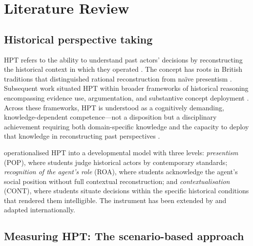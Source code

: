 \documentclass[pdflatex,sn-apa]{sn-jnl}%
\begin{document}

\section{Literature Review}\label{sec:litreview}

\subsection{Historical perspective taking}\label{subsec:hpt}

HPT refers to the ability to understand past actors' decisions by reconstructing the historical context in which they operated \citep{Lee2001, Hartmann2008}. The concept has roots in British traditions that distinguished rational reconstruction from na\"ive presentism \citep{Ashby1987, Lee2001}. Subsequent work situated HPT within broader frameworks of historical reasoning encompassing evidence use, argumentation, and substantive concept deployment \citep{VanBoxtel2018, vanDrie2007}. Across these frameworks, HPT is understood as a cognitively demanding, knowledge-dependent competence---not a disposition but a disciplinary achievement requiring both domain-specific knowledge and the capacity to deploy that knowledge in reconstructing past perspectives \citep{Chapman2021, Wineburg2001}.

\citet{Hartmann2008} operationalised HPT into a developmental model with three levels: \emph{presentism} (POP), where students judge historical actors by contemporary standards; \emph{recognition of the agent's role} (ROA), where students acknowledge the agent's social position without full contextual reconstruction; and \emph{contextualisation} (CONT), where students situate decisions within the specific historical conditions that rendered them intelligible. The instrument has been extended by \citet{Huijgen2014, Huijgen2017} and adapted internationally.

\subsection{Measuring HPT: The scenario-based approach}\label{subsec:measuring}
\end{document}
